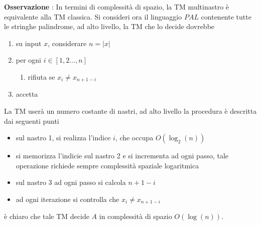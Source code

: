 \documentclass[10pt, letterpaper]{report}
\begin{document}
\textbf{Osservazione} : In termini di complessità di spazio, la TM multinastro è equivalente alla TM classica.\acc 
Si consideri ora il linguaggio $PAL$ contenente tutte le stringhe palindrome, ad alto livello, la TM che lo decide dovrebbe\begin{enumerate}
    \item su input $x$, considerare $n=|x|$
    \item per ogni $i\in[1,2 \dots , n]$\begin{enumerate}
        \item rifiuta se $x_i\ne x_{n+1-i}$
    \end{enumerate}
    \item accetta
\end{enumerate}
La TM userà un numero costante di nastri, ad alto livello la procedura è descritta dai seguenti punti\begin{itemize}
    \item sul nastro 1, si realizza l'indice $i$, che occupa $O(\log_2(n))$
    \item si memorizza l'indicie sul nastro 2 e si incrementa ad ogni passo, tale operazione richiede sempre complessità spaziale logaritmica 
    \item sul nastro 3 ad ogni passo si calcola $n+1-i$
    \item ad ogni iterazione si controlla che $x_i\ne x_{n+1-i}$
\end{itemize}
è chiaro che tale TM decide $A$ in complessità di spazio $O(\log(n))$.
\end{document}

